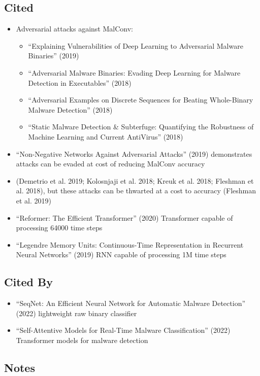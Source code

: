 \documentclass{article}
\begin{document}
\subsection*{Cited}
\begin{itemize}
	\item Adversarial attacks against MalConv:
	\begin{itemize}
		\item ``Explaining Vulnerabilities of Deep Learning to Adversarial Malware Binaries'' (2019)
		\item ``Adversarial Malware Binaries: Evading Deep Learning for Malware Detection in Executables'' (2018)
		\item ``Adversarial Examples on Discrete Sequences for Beating Whole-Binary Malware Detection'' (2018)
		\item ``Static Malware Detection \& Subterfuge: Quantifying the Robustness of Machine Learning and Current AntiVirus'' (2018)
	\end{itemize}
	\item ``Non-Negative Networks Against Adversarial Attacks'' (2019) demonstrates attacks can be evaded at cost of reducing MalConv accuracy
	\item (Demetrio et al. 2019; Kolosnjaji et al. 2018; Kreuk et al.
	2018; Fleshman et al. 2018), but these attacks can be thwarted
	at a cost to accuracy (Fleshman et al. 2019)
	\item ``Reformer: The Efficient Transformer'' (2020) Transformer capable of processing 64000 time steps
	\item ``Legendre Memory Units: Continuous-Time Representation in Recurrent Neural Networks'' (2019) RNN capable of processing 1M time steps
\end{itemize}

\subsection*{Cited By}
\begin{itemize}
	\item ``SeqNet: An Efficient Neural Network for Automatic Malware Detection'' (2022) lightweight raw binary classifier
	\item ``Self-Attentive Models for Real-Time Malware Classification'' (2022) Transformer models for malware detection
\end{itemize}

\subsection*{Notes}
\end{document}
